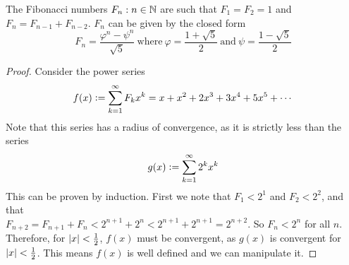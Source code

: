 \begin{theorem}
The Fibonacci numbers \(F_n: n \in \mathbb N\) are such that
\(F_1 = F_2 = 1\) and \(F_n = F_{n - 1} + F_{n - 2}\).  \(F_n\) can be given
by the closed form
\begin{equation*}
F_n = \frac{\varphi^n - \psi^n}{\sqrt 5}
\ \text{where}\ \varphi = \frac{1 + \sqrt 5} 2
\ \text{and}\ \psi = \frac{1 - \sqrt 5} 2
\end{equation*}
\end{theorem}
\begin{proof}
Consider the power series
\begin{equation*}
f(x) \vcentcolon= \sum_{k=1}^\infty F_k x^k = x + x^2 + 2x^3 + 3x^4 + 5x^5
    + \dotsb
\end{equation*}
Note that this series has a radius of convergence, as it is strictly less
than the series
\begin{equation*}
g(x) \vcentcolon= \sum_{k=1}^\infty 2^k x^k
\end{equation*}
This can be proven by induction. First we note that \(F_1 < 2^1\) and
\(F_2 < 2^2\), and that \\
\(F_{n + 2} = F_{n + 1} + F_n < 2^{n + 1} + 2^n < 2^{n + 1} + 2^{n + 1}
    = 2^{n + 2}\). So \(F_n < 2^n\) for all \(n\). Therefore, for
\(\lvert x\rvert < \frac 12\), \(f(x)\)  must be convergent, as \(g(x)\) is
convergent for \(\lvert x\rvert < \frac 12\). This means \(f(x)\) is well defined
and we can manipulate it.


\end{proof}
